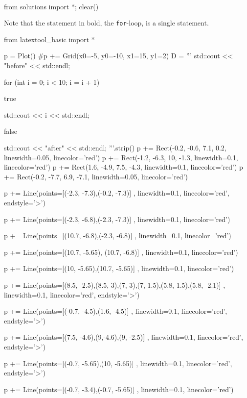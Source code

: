 \\
\begin{python0}
from solutions import *; clear()
\end{python0}


Note that the statement in bold, the \texttt{for}-loop, is a single
statement.
\begin{python}
from latextool_basic import *

p = Plot()
#p += Grid(x0=-5, y0=-10, x1=15, y1=2)
D = '''
std::cout << "before" << std::endl;




for (int i = 0;        i < 10;        i = i + 1)



true

         std::cout << i << std::endl;

false




std::cout << "after" << std::endl;
'''.strip()
p += Rect(-0.2, -0.6, 7.1, 0.2, linewidth=0.05, linecolor='red')
p += Rect(-1.2, -6.3, 10, -1.3, linewidth=0.1, linecolor='red')
p += Rect(1.6, -4.9, 7.5, -4.3, linewidth=0.1, linecolor='red')
p += Rect(-0.2, -7.7, 6.9, -7.1, linewidth=0.05, linecolor='red')


p += Line(points=[(-2.3, -7.3),(-0.2, -7.3)] , linewidth=0.1, linecolor='red', endstyle='>')

p += Line(points=[(-2.3, -6.8),(-2.3, -7.3)] , linewidth=0.1, linecolor='red')

p += Line(points=[(10.7, -6.8),(-2.3, -6.8)] , linewidth=0.1, linecolor='red')

p += Line(points=[(10.7, -5.65), (10.7, -6.8)] , linewidth=0.1, linecolor='red')

p += Line(points=[(10, -5.65),(10.7, -5.65)] , linewidth=0.1, linecolor='red')

p += Line(points=[(8.5, -2.5),(8.5,-3),(7,-3),(7,-1.5),(5.8,-1.5),(5.8, -2.1)] , linewidth=0.1, linecolor='red', endstyle='>')

p += Line(points=[(-0.7, -4.5),(1.6, -4.5)] , linewidth=0.1, linecolor='red', endstyle='>')

p += Line(points=[(7.5, -4.6),(9,-4.6),(9, -2.5)] , linewidth=0.1, linecolor='red', endstyle='>')

p += Line(points=[(-0.7, -5.65),(10, -5.65)] , linewidth=0.1, linecolor='red', endstyle='>')

p += Line(points=[(-0.7, -3.4),(-0.7, -5.65)] , linewidth=0.1, linecolor='red')


\end{python}
